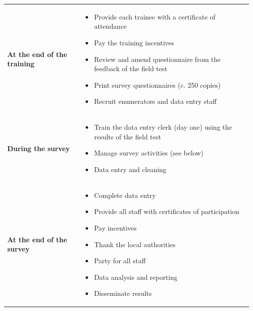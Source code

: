 \documentclass[12pt,a4paper]{book}
\providecommand{\tightlist}{%
  \setlength{\itemsep}{0pt}\setlength{\parskip}{0pt}}
\theoremstyle{definition}
\theoremstyle{definition}
\theoremstyle{definition}
\theoremstyle{remark}
\begin{document}
\begin{longtable}[]{@{}ll@{}}
\toprule
\begin{minipage}[t]{0.48\columnwidth}\raggedright
\textbf{At the end of the training}\strut
\end{minipage} & \begin{minipage}[t]{0.48\columnwidth}\raggedright
\begin{itemize}
\tightlist
\item
  Provide each trainee with a certificate of attendance
\item
  Pay the training incentives
\item
  Review and amend questionnaire from the feedback of the field test
\item
  Print survey questionnaires (c. 250 copies)
\item
  Recruit enumerators and data entry staff
\end{itemize}\strut
\end{minipage}\tabularnewline
\begin{minipage}[t]{0.48\columnwidth}\raggedright
\textbf{During the survey}\strut
\end{minipage} & \begin{minipage}[t]{0.48\columnwidth}\raggedright
\begin{itemize}
\tightlist
\item
  Train the data entry clerk (day one) using the results of the field
  test
\item
  Manage survey activities (see below)
\item
  Data entry and cleaning
\end{itemize}\strut
\end{minipage}\tabularnewline
\begin{minipage}[t]{0.48\columnwidth}\raggedright
\textbf{At the end of the survey}\strut
\end{minipage} & \begin{minipage}[t]{0.48\columnwidth}\raggedright
\begin{itemize}
\tightlist
\item
  Complete data entry
\item
  Provide all staff with certificates of participation
\item
  Pay incentives
\item
  Thank the local authorities
\item
  Party for all staff
\item
  Data analysis and reporting
\item
  Disseminate results
\end{itemize}\strut
\end{minipage}\tabularnewline
\bottomrule
\end{longtable}
\end{document}
